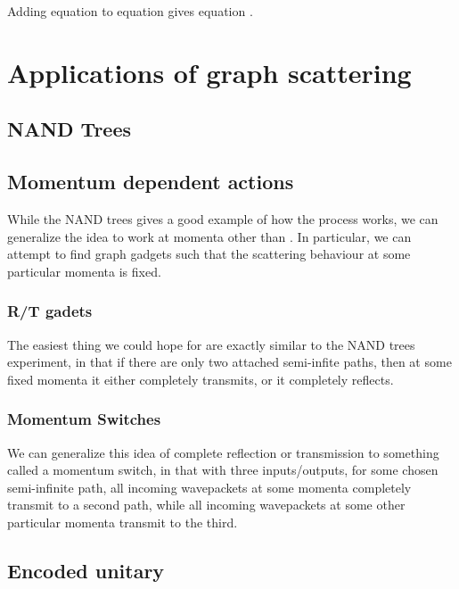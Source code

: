 \documentclass[../thesis-main/thesis-main]{subfiles}
\begin{document}
 Adding equation  to equation  gives
equation .


\section{Applications of graph scattering}

\subsection{NAND Trees}


\subsection{Momentum dependent actions}

While the NAND trees gives a good example of how the process works, we can generalize the idea to work at momenta other than .  In particular, we can attempt to find graph gadgets such that the scattering behaviour at some particular momenta is fixed.

\subsubsection{R/T gadets}

The easiest thing we could hope for are exactly similar to the NAND trees experiment, in that if there are only two attached semi-infite paths, then at some fixed momenta it either completely transmits, or it completely reflects.  

\subsubsection{Momentum Switches}

We can generalize this idea of complete reflection or transmission to something called a momentum switch, in that with three inputs/outputs, for some chosen semi-infinite path, all incoming wavepackets at some momenta completely transmit to a second path, while all incoming wavepackets at some other particular momenta transmit to the third.

\subsection{Encoded unitary}
\end{document}
